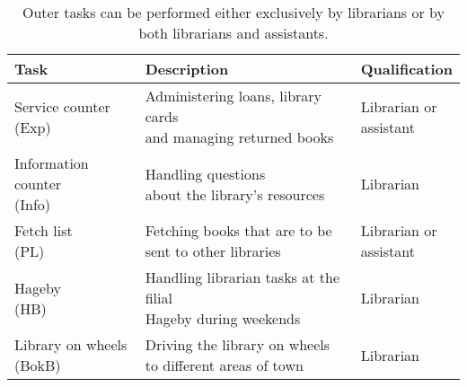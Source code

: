 \begin{table}[h]
\centering
\caption{Outer tasks can be performed either exclusively by librarians or by both librarians and assistants.}
\label{tab:Outer_Tasks}
\begin{tabularx}{\textwidth}{|l|l|X|}
\hline
\textbf{Task} & \textbf{Description} & \textbf{Qualification}\\ \hline 
\specialcell[t]{Service counter \\ (Exp)}  & \specialcell[t]{Administering loans, library cards\\ and managing returned books} & \specialcell[t]{Librarian or \\  assistant} 
\\ \hline
\specialcell[t]{Information counter \\ (Info)} & \specialcell[t]{Handling questions \\about the library's resources} & Librarian
\\ \hline 
\specialcell[t]{Fetch list \\(PL)} & \specialcell[t]{Fetching books that are to be \\sent to other libraries} & \specialcell[t]{Librarian  or \\  assistant}
\\ \hline 
\specialcell[t]{Hageby \\(HB)} & \specialcell[t]{Handling librarian tasks at the filial \\ Hageby during weekends} & Librarian
\\ \hline 
\specialcell[t]{Library on wheels \\(BokB)} & \specialcell[t]{Driving the library on wheels \\ to different areas of town} & Librarian
\\ \hline 
\end{tabularx}
\end{table} 

